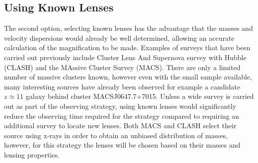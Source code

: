 	\subsection{Using Known Lenses} %
	\label{sub:using_known_lenses}
		The second option, selecting known lenses has the advantage that the masses and velocity dispersions would already be well determined, allowing an accurate calculation of the magnification to be made. Examples of surveys that have been carried out previously include Cluster Lens And Supernova survey with Hubble (CLASH)\cite{CLASH} and the MAssive Cluster Survey (MACS)\cite{MACS}. There are only a limited number of massive clusters known, however even with the small sample available, many interesting sources have already been observed for example a candidate $z\approx11$ galaxy behind cluster MACSJ0647.7+7015\cite{CLASH_z11_candidate}. Unless a wide survey is carried out as part of the observing strategy, using known lenses would significantly reduce the observing time required for the strategy compared to requiring an additional survey to locate new lenses. Both MACS and CLASH select their source using x-rays in order to obtain an unbiased distribution of masses, however, for this strategy the lenses will be chosen based on their masses and lensing properties.


